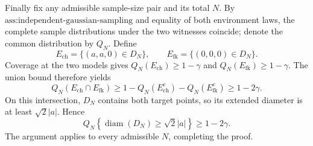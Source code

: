 Finally fix any admissible sample-size pair and its total \(N\).  By \(\text{ass:independent-gaussian-sampling}\) and equality of both environment laws, the complete sample distributions under the two witnesses coincide; denote the common distribution by \(Q_N\).  Define
\[
 E_{\mathrm{ch}}=\{(a,a,0)\in D_N\},\qquad
 E_{\mathrm{fk}}=\{(0,0,0)\in D_N\}.
\]
Coverage at the two models gives \(Q_N(E_{\mathrm{ch}})\ge1-\gamma\) and \(Q_N(E_{\mathrm{fk}})\ge1-\gamma\).  The union bound therefore yields
\[
 Q_N(E_{\mathrm{ch}}\cap E_{\mathrm{fk}})
 \ge1-Q_N(E_{\mathrm{ch}}^c)-Q_N(E_{\mathrm{fk}}^c)
 \ge1-2\gamma.
\]
On this intersection, \(D_N\) contains both target points, so its extended diameter is at least \(\sqrt2|a|\).  Hence
\[
 Q_N\!\left\{\operatorname{diam}(D_N)\ge\sqrt2|a|\right\}\ge1-2\gamma.
\]
The argument applies to every admissible \(N\), completing the proof.